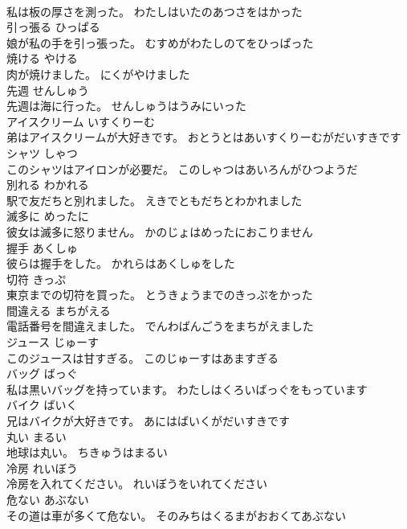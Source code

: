 \documentclass[8pt]{extreport}
\begin{document}
\begin{CJK}{UTF8}{min}
\\	私は板の厚さを測った。	わたしはいたのあつさをはかった	
\\	引っ張る	ひっぱる	
\\	娘が私の手を引っ張った。	むすめがわたしのてをひっぱった	
\\	焼ける	やける	
\\	肉が焼けました。	にくがやけました	
\\	先週	せんしゅう	
\\	先週は海に行った。	せんしゅうはうみにいった	
\\	アイスクリーム	いすくりーむ	
\\	弟はアイスクリームが大好きです。	おとうとはあいすくりーむがだいすきです	
\\	シャツ	しゃつ	
\\	このシャツはアイロンが必要だ。	このしゃつはあいろんがひつようだ	
\\	別れる	わかれる	
\\	駅で友だちと別れました。	えきでともだちとわかれました	
\\	滅多に	めったに	
\\	彼女は滅多に怒りません。	かのじょはめったにおこりません	
\\	握手	あくしゅ	
\\	彼らは握手をした。	かれらはあくしゅをした	
\\	切符	きっぷ	
\\	東京までの切符を買った。	とうきょうまでのきっぷをかった	
\\	間違える	まちがえる	
\\	電話番号を間違えました。	でんわばんごうをまちがえました	
\\	ジュース	じゅーす	
\\	このジュースは甘すぎる。	このじゅーすはあますぎる	
\\	バッグ	ばっぐ	
\\	私は黒いバッグを持っています。	わたしはくろいばっぐをもっています	
\\	バイク	ばいく	
\\	兄はバイクが大好きです。	あにはばいくがだいすきです	
\\	丸い	まるい	
\\	地球は丸い。	ちきゅうはまるい	
\\	冷房	れいぼう	
\\	冷房を入れてください。	れいぼうをいれてください	
\\	危ない	あぶない	
\\	その道は車が多くて危ない。	そのみちはくるまがおおくてあぶない	

\end{CJK}
\end{document}

